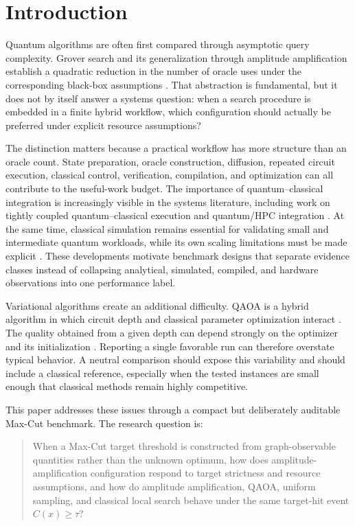 \documentclass[5p,times]{elsarticle}
\begin{document}
\section{Introduction}
Quantum algorithms are often first compared through asymptotic query complexity. Grover search and its generalization through amplitude amplification establish a quadratic reduction in the number of oracle uses under the corresponding black-box assumptions \cite{grover1996,brassard2002}. That abstraction is fundamental, but it does not by itself answer a systems question: when a search procedure is embedded in a finite hybrid workflow, which configuration should actually be preferred under explicit resource assumptions?

The distinction matters because a practical workflow has more structure than an oracle count. State preparation, oracle construction, diffusion, repeated circuit execution, classical control, verification, compilation, and optimization can all contribute to the useful-work budget. The importance of quantum--classical integration is increasingly visible in the systems literature, including work on tightly coupled quantum--classical execution and quantum/HPC integration \cite{netzer2026,markidis2026editorial}. At the same time, classical simulation remains essential for validating small and intermediate quantum workloads, while its own scaling limitations must be made explicit \cite{vallero2026}. These developments motivate benchmark designs that separate evidence classes instead of collapsing analytical, simulated, compiled, and hardware observations into one performance label.

Variational algorithms create an additional difficulty. QAOA is a hybrid algorithm in which circuit depth and classical parameter optimization interact \cite{farhi2014}. The quality obtained from a given depth can depend strongly on the optimizer and its initialization \cite{fernandez2022,sack2021,pan2022}. Reporting a single favorable run can therefore overstate typical behavior. A neutral comparison should expose this variability and should include a classical reference, especially when the tested instances are small enough that classical methods remain highly competitive.

This paper addresses these issues through a compact but deliberately auditable Max-Cut benchmark. The research question is:

\begin{quote}
When a Max-Cut target threshold is constructed from graph-observable quantities rather than the unknown optimum, how does amplitude-amplification configuration respond to target strictness and resource assumptions, and how do amplitude amplification, QAOA, uniform sampling, and classical local search behave under the same target-hit event $C(x)\geq\tau$?
\end{quote}
\end{document}
